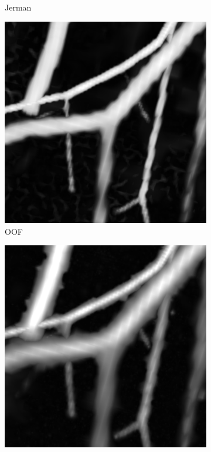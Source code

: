 \begin{figure}[!ht]
\begin{subfigure}[t]{0.30\textwidth}
      \caption{Jerman}
    \end{subfigure}
    \begin{subfigure}[t]{0.30\textwidth}
      \includegraphics[clip = true, trim  =  170 230 150 240, width=\textwidth]{Images/Vascu_2_k_OOF_GM.png}
      \caption{OOF}
    \end{subfigure}
    \begin{subfigure}[t]{0.30\textwidth}
      \includegraphics[clip = true,trim  =  170 230 150 240, width=\textwidth]{Images/Vascu_2_k_Meijering.png}

\end{subfigure}
\end{figure}
